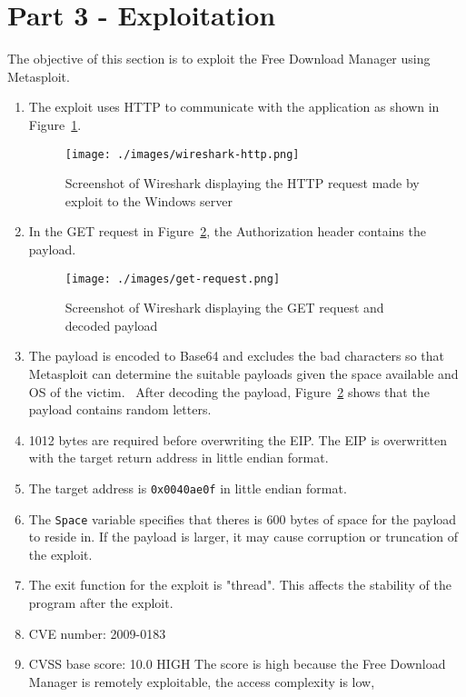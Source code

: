 \documentclass[11pt]{article}
\begin{document}
\section*{Part 3 - Exploitation}
\label{sec:part-3}
The objective of this section is to exploit the Free Download Manager using Metasploit.

\begin{enumerate}
  \item The exploit uses HTTP to communicate with the application as shown in Figure~\ref{fig:wireshark-http}.
  \begin{figure}[htbp]
    \centering
    \texttt{[image: ./images/wireshark-http.png]}
    \caption{\label{fig:wireshark-http}
      Screenshot of Wireshark displaying the HTTP request made by exploit to the Windows server}
  \end{figure}
  \item In the GET request in Figure~\ref{fig:get-request}, the Authorization header contains the payload.
  \begin{figure}[htbp]
    \centering
    \texttt{[image: ./images/get-request.png]}
    \caption{\label{fig:get-request}
      Screenshot of Wireshark displaying the GET request and decoded payload}
  \end{figure}
  \item The payload is encoded to Base64 and excludes the bad characters so that Metasploit can
  determine the suitable payloads given the space available and OS of the victim.~\cite{metasploit} After
  decoding the payload, Figure~\ref{fig:get-request} shows that the payload contains random letters.
  \item 1012 bytes are required before overwriting the EIP. The EIP is overwritten with the target
  return address in little endian format.
  \item The target address is \verb|0x0040ae0f| in little endian format.
  \item The \verb|Space| variable specifies that theres is 600 bytes of space for the payload
  to reside in. If the payload is larger, it may cause corruption or truncation of the exploit.
  \item The exit function for the exploit is "thread". This affects the stability
  of the program after the exploit.
  \item CVE number: 2009-0183
  \item CVSS base score: 10.0 HIGH
  The score is high because the Free Download Manager is remotely exploitable, the access complexity is low,

\end{enumerate}
\end{document}
